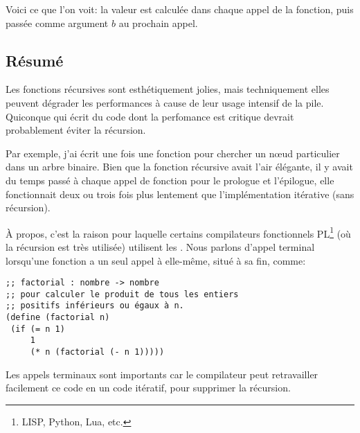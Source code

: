 

Voici ce que l'on voit: la valeur  est calculée dans chaque appel de la fonction,
puis passée comme argument $b$ au prochain appel.

\subsection{Résumé}

\label{Recursion_and_tail_call}
\myindex{\Recursion}
Les fonctions récursives sont esthétiquement jolies, mais techniquement elles
peuvent dégrader les performances à cause de leur usage intensif de la pile.
Quiconque qui écrit du code dont la perfomance est critique devrait probablement
éviter la récursion.

Par exemple, j'ai écrit une fois une fonction pour chercher un n\oe{}ud particulier
dans un arbre binaire.
Bien que la fonction récursive avait l'air élégante, il y avait du temps passé à
chaque appel de fonction pour le prologue et l'épilogue, elle fonctionnait deux ou
trois fois plus lentement que l'implémentation itérative (sans récursion).

\newcommand{\FnFP}{\footnote{LISP, Python, Lua, etc.}}

À propos, c'est la raison pour laquelle certains compilateurs fonctionnels \ac{PL}\FnFP{}
(où la récursion est très utilisée) utilisent les .
Nous parlons d'appel terminal lorsqu'une fonction a un seul appel à elle-même, situé
à sa fin, comme:

\begin{lstlisting}[caption=Scheme{,} exemple copié/collé depuis Wikipédia]
;; factorial : nombre -> nombre
;; pour calculer le produit de tous les entiers
;; positifs inférieurs ou égaux à n.
(define (factorial n)
 (if (= n 1)
     1
	 (* n (factorial (- n 1)))))
\end{lstlisting}

Les appels terminaux sont importants car le compilateur peut retravailler facilement
ce code en un code itératif, pour supprimer la récursion.

